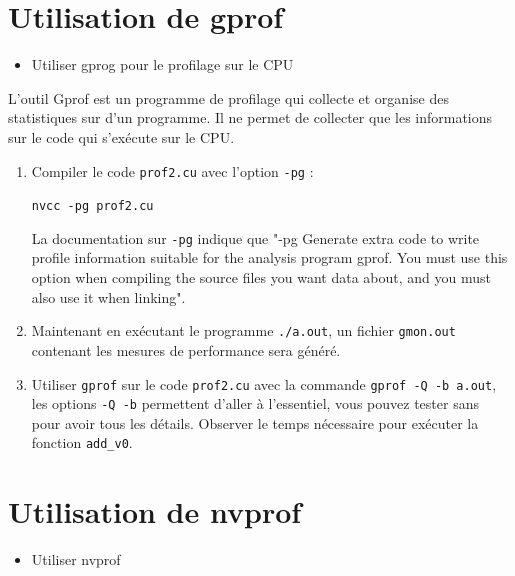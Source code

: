  \section{Utilisation de gprof}

\begin{objectif}[]{}
 \begin{itemize}
	\item Utiliser gprog pour le profilage sur le CPU
\end{itemize}
\end{objectif}

\begin{wtodo}{}
L'outil Gprof est un programme de profilage qui collecte et organise des statistiques sur d'un programme. Il ne permet de collecter que les informations sur le code qui s'exécute sur le CPU.
	
	\begin{enumerate}
		\item Compiler le code {\tt prof2.cu} avec l'option {\tt -pg} :
	
			{\tt nvcc -pg prof2.cu}
		
		La documentation sur {\tt -pg} indique que "-pg Generate extra code to write profile information suitable for the analysis program gprof. You must use this option when compiling the source files you want data about, and you must also use it when linking".
		\item Maintenant en exécutant le programme {\tt ./a.out}, un fichier {\tt gmon.out} contenant les mesures de performance sera généré.		
		\item  Utiliser {\tt gprof} sur le code {\tt prof2.cu} avec la commande  {\tt gprof -Q -b a.out}, les options {\tt -Q -b} permettent d'aller à l'essentiel, vous pouvez tester sans pour avoir tous les détails. Observer le temps nécessaire pour exécuter la fonction {\tt add\_v0}.
	\end{enumerate}

\end{wtodo}

\newpage

  \section{Utilisation de nvprof}

\begin{objectif}[]{}
 \begin{itemize}
	\item Utiliser nvprof
\end{itemize}
\end{objectif}

